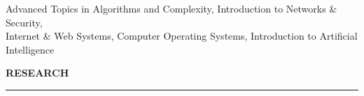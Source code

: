 \documentclass{resume} %
\begin{document}
\hspace*{1mm}{\em Relevant Courses:} Advanced Topics in Algorithms and Complexity, Introduction to Networks \& Security, \\
\hspace*{2mm}Internet \& Web Systems, Computer Operating Systems, Introduction to Artificial Intelligence



\medskip
\MakeUppercase{\bf Research}
\medskip
\hrule
\end{document}
